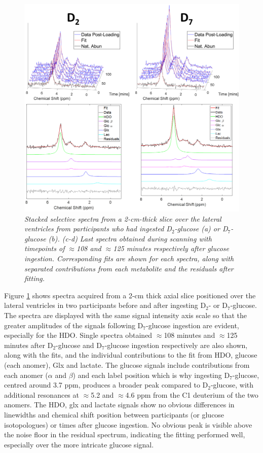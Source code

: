 \begin{figure}
    \centering
    \includegraphics[width = 1\textwidth]{Figures/Glucose/Selective.png}
    \caption{\textit{Stacked selective spectra from a 2-cm-thick slice over the lateral ventricles from participants who had ingested D$_2$-glucose (a) or D$_7$-glucose (b). (c-d) Last spectra obtained during scanning with timepoints of $\approx$108 and $\approx$125 minutes respectively after glucose ingestion. Corresponding fits are shown for each spectra, along with separated contributions from each metabolite and the residuals after fitting.}}
    \label{fig:Glu:Select}
\end{figure}

Figure \ref{fig:Glu:Select} shows spectra acquired from a 2-cm thick axial slice positioned over the lateral ventricles in two participants before and after ingesting D$_2$- or D$_7$-glucose. The spectra are displayed with the same signal intensity axis scale so that the greater amplitudes of the signals following D$_7$-glucose ingestion are evident, especially for the \ac{HDO}. Single spectra obtained $\approx$108 minutes and $\approx$125 minutes after D$_2$-glucose and D$_7$-glucose ingestion respectively are also shown, along with the fits, and the individual contributions to the fit from \ac{HDO}, glucose (each anomer), Glx and lactate. The glucose signals include contributions from each anomer ($\alpha$ and $\beta$) and each label position which is why ingesting D$_7$-glucose, centred around 3.7 ppm, produces a broader peak compared to D$_2$-glucose, with additional resonances at $\approx$5.2 and $\approx$4.6 ppm from the C1 deuterium of the two anomers. The \ac{HDO}, glx and lactate signals show no obvious differences in linewidths and chemical shift position between participants (or glucose isotopologues) or times after glucose ingestion. No obvious peak is visible above the noise floor in the residual spectrum, indicating the fitting performed well, especially over the more intricate glucose signal.

